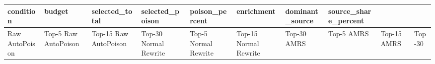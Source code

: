 \begin{tabular}{llllllll}
\toprule
condition & budget & selected\_total & selected\_poison & poison\_percent & enrichment & dominant\_source & source\_share\_percent \\
\midrule
Raw AutoPoison & Top-5%
Raw AutoPoison & Top-15%
Raw AutoPoison & Top-30%
Normal Rewrite & Top-5%
Normal Rewrite & Top-15%
Normal Rewrite & Top-30%
AMRS & Top-5%
AMRS & Top-15%
AMRS & Top-30%
\bottomrule
\end{tabular}
